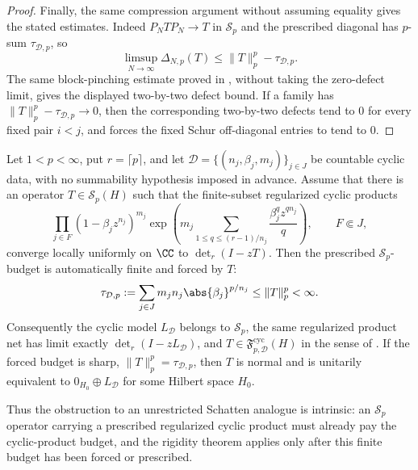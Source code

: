 \begin{proof}
  Finally, the same compression argument without assuming equality gives
  the stated estimates. Indeed
  \(P_NTP_N\to T\) in \(\mathcal S_p\) and the prescribed diagonal has
  \(p\)-sum \(\tau_{\mathcal D,p}\), so
  \[
    \limsup_{N\to\infty}\Delta_{N,p}(T)
    \le \|T\|_p^p-\tau_{\mathcal D,p}.
  \]
  The same block-pinching estimate proved in
  , without taking the
  zero-defect limit, gives the displayed two-by-two defect bound. If a family has
  \(\|T\|_p^p-\tau_{\mathcal D,p}\to0\), then the corresponding
  two-by-two defects tend to \(0\) for every fixed pair \(i<j\), and
   forces the fixed Schur
  off-diagonal entries to tend to \(0\).
\end{proof}


\begin{theorem}
  \label{thm:schatten-forced-prescribed-budget-obstruction}
  Let \(1<p<\infty\), put \(r=\lceil p\rceil\), and let
  \(\mathcal D=\{(n_j,\beta_j,m_j)\}_{j\in J}\) be countable cyclic data,
  with no summability hypothesis imposed in advance.  Assume that there is an
  operator \(T\in\mathcal S_p(H)\) such that the finite-subset regularized
  cyclic products
  \[
    \prod_{j\in F}
      (1-\beta_jz^{n_j})^{m_j}
      \exp\!\left(
        m_j\sum_{1\le q\le (r-1)/n_j}
          \frac{\beta_j^qz^{qn_j}}{q}
      \right),
      \qquad F\Subset J,
  \]
  converge locally uniformly on \(\CC\) to \(\det_r(I-zT)\).  Then the
  prescribed \(\mathcal S_p\)-budget is automatically finite and forced by
  \(T\):
  \[
    \tau_{\mathcal D,p}
    :=\sum_{j\in J}m_jn_j\abs{\beta_j}^{p/n_j}
    \le \|T\|_p^p<\infty .
  \]
  Consequently the cyclic model \(L_{\mathcal D}\) belongs to
  \(\mathcal S_p\), the same regularized product net has limit exactly
  \(\det_r(I-zL_{\mathcal D})\), and
  \(T\in\mathfrak F_{p,\mathcal D}^{\mathrm{cyc}}(H)
  \) in the sense of .  If
  the forced budget is sharp, \(\|T\|_p^p=\tau_{\mathcal D,p}\), then
  \(T\) is normal and is unitarily equivalent to
  \(0_{H_0}\oplus L_{\mathcal D}\) for some Hilbert space \(H_0\).

  Thus the obstruction to an unrestricted Schatten analogue is intrinsic:
  an \(\mathcal S_p\) operator carrying a prescribed regularized cyclic
  product must already pay the cyclic-product budget, and the rigidity theorem
  applies only after this finite budget has been forced or prescribed.
\end{theorem}

